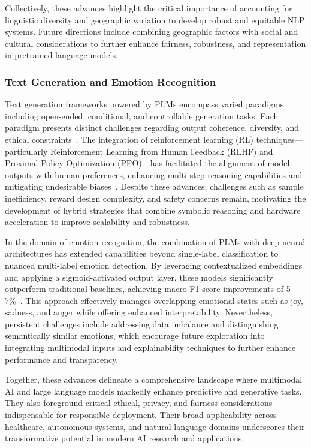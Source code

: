 \documentclass[sigconf]{acmart}
\begin{document}
Collectively, these advances highlight the critical importance of accounting for linguistic diversity and geographic variation to develop robust and equitable NLP systems. Future directions include combining geographic factors with social and cultural considerations to further enhance fairness, robustness, and representation in pretrained language models.

\subsubsection{Text Generation and Emotion Recognition}

Text generation frameworks powered by PLMs encompass varied paradigms including open-ended, conditional, and controllable generation tasks. Each paradigm presents distinct challenges regarding output coherence, diversity, and ethical constraints~\cite{ref39}. The integration of reinforcement learning (RL) techniques—particularly Reinforcement Learning from Human Feedback (RLHF) and Proximal Policy Optimization (PPO)—has facilitated the alignment of model outputs with human preferences, enhancing multi-step reasoning capabilities and mitigating undesirable biases~\cite{ref9}. Despite these advances, challenges such as sample inefficiency, reward design complexity, and safety concerns remain, motivating the development of hybrid strategies that combine symbolic reasoning and hardware acceleration to improve scalability and robustness.

In the domain of emotion recognition, the combination of PLMs with deep neural architectures has extended capabilities beyond single-label classification to nuanced multi-label emotion detection. By leveraging contextualized embeddings and applying a sigmoid-activated output layer, these models significantly outperform traditional baselines, achieving macro F1-score improvements of 5–7\%~\cite{ref36}. This approach effectively manages overlapping emotional states such as joy, sadness, and anger while offering enhanced interpretability. Nevertheless, persistent challenges include addressing data imbalance and distinguishing semantically similar emotions, which encourage future exploration into integrating multimodal inputs and explainability techniques to further enhance performance and transparency.

Together, these advances delineate a comprehensive landscape where multimodal AI and large language models markedly enhance predictive and generative tasks. They also foreground critical ethical, privacy, and fairness considerations indispensable for responsible deployment. Their broad applicability across healthcare, autonomous systems, and natural language domains underscores their transformative potential in modern AI research and applications.
\end{document}

